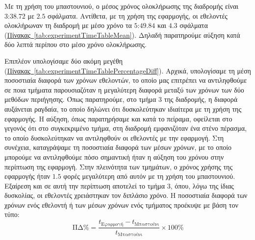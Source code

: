 

Με τη χρήση του μπαστουνιού, ο μέσος χρόνος ολοκλήρωσης της διαδρομής είναι $\text{3:38.72}$ με $\text{2.5}$ σφάλματα. Αντίθετα, με τη χρήση της εφαρμογής, οι εθελοντές ολοκλήρωναν τη διαδρομή με μέσο χρόνο τα $\text{5:49.84}$ και $\text{4.3}$ σφάλματα (\hyperref[tab:experimentTimeTableMean]{Πίνακας~\ref*{tab:experimentTimeTableMean}}). Δηλαδή παρατηρούμε αύξηση κατά δύο λεπτά περίπου στο μέσο χρόνο ολοκλήρωσης.

Επιπλέον υπολογίσαμε δύο ακόμη μεγέθη (\hyperref[tab:experimentTimeTablePercentageDiff]{Πίνακας~\ref*{tab:experimentTimeTablePercentageDiff}}). Αρχικά, υπολογίσαμε τη μέση ποσοστιαία διαφορά των χρόνων εθελοντών, το οποίο μας επιτρέπει να αντιληφθούμε σε ποια τμήματα παρουσιαζόταν η μεγαλύτερη διαφορά μεταξύ των χρόνων των δύο μεθόδων περιήγησης. Όπως παρατηρούμε, στο τμήμα 3 της διαδρομής, η διαφορά αυξάνεται ραγδαία, το οποίο δηλώνει ότι δυσκολεύτηκαν ιδιαίτερα με τη χρήση της εφαρμογής. Η αύξηση, όπως παρατηρήσαμε και κατά το πείραμα, οφείλεται στο γεγονός ότι στο συγκεκριμένο τμήμα, στη διαδρομή εμφανιζόταν ένα στένο πέρασμα, το οποίο δυσκολεύτηκαν να αντιληφθούν οι εθελοντές με την εφαρμογή. Στη συνέχεια, καταγράψαμε τη ποσοστιαία διαφορά των μέσων χρόνων, με το οποίο μπορούμε να αντιληφθούμε πόσο σημαντική ήταν η αύξηση του χρόνου στην περίπτωση της εφαρμογή. Στην πλεινότητα των τμημάτων, ο χρόνος χρήσης της εφαρμογής ήταν $1.5$ φορές μεγαλύτερη από αυτόν με τη χρήση του μπαστουνιού. Εξαίρεση και σε αυτή την περίπτωση αποτελεί το τμήμα 3, όπου, λόγω της ίδιας δυσκολίας, οι εθελοντές χρειάστηκαν τον διπλάσιο χρόνο. Η ποσοστιαία διαφορά των χρόνων ενός εθελοντή ή των μέσων χρόνων ενός τμήματος προέκυψε με βάση τον τύπο:
\[
    \text{ΠΔ\%} = \frac{t_{\text{Εφαρμογή}} - t_{\text{Μπαστούνι}}}{t_{\text{Μπαστούνι}}} \times 100\%
\]

